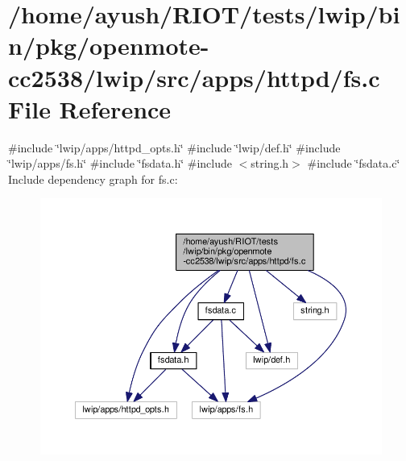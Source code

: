 \hypertarget{openmote-cc2538_2lwip_2src_2apps_2httpd_2fs_8c}{}\section{/home/ayush/\+R\+I\+O\+T/tests/lwip/bin/pkg/openmote-\/cc2538/lwip/src/apps/httpd/fs.c File Reference}
\label{openmote-cc2538_2lwip_2src_2apps_2httpd_2fs_8c}
{\ttfamily \#include \char`\"{}lwip/apps/httpd\+\_\+opts.\+h\char`\"{}}\newline
{\ttfamily \#include \char`\"{}lwip/def.\+h\char`\"{}}\newline
{\ttfamily \#include \char`\"{}lwip/apps/fs.\+h\char`\"{}}\newline
{\ttfamily \#include \char`\"{}fsdata.\+h\char`\"{}}\newline
{\ttfamily \#include $<$string.\+h$>$}\newline
{\ttfamily \#include \char`\"{}fsdata.\+c\char`\"{}}\newline
Include dependency graph for fs.\+c\+:
\nopagebreak
\begin{figure}[H]
\begin{center}
\leavevmode
\includegraphics[width=350pt]{openmote-cc2538_2lwip_2src_2apps_2httpd_2fs_8c__incl}
\end{center}
\end{figure}
